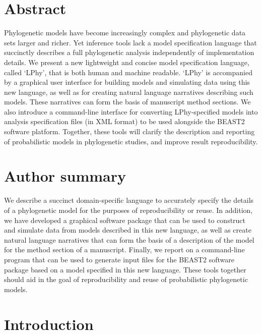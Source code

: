 \documentclass[10pt,letterpaper,table]{article}
\begin{document}
\section*{Abstract}
  Phylogenetic models have become increasingly complex and phylogenetic data sets larger and richer.
  Yet inference tools lack a model specification language that succinctly describes a full phylogenetic analysis independently of implementation details.
  We present a new lightweight and concise model specification language, called `LPhy', that is both human and machine readable.
  `LPhy' is accompanied by a graphical user interface for building models and simulating data using this new language, as well as for creating natural language narratives describing such models.
  These narratives can form the basis of manuscript method sections.
  We also introduce a command-line interface for converting LPhy-specified models into analysis specification files (in XML format) to be used alongside the BEAST2 software platform.
  Together, these tools will clarify the description and reporting of probabilistic models in phylogenetic studies, and improve result reproducibility.


\section*{Author summary}
  We describe a succinct domain-specific language to accurately specify the details of a phylogenetic model for the purposes of reproducibility or reuse.
  In addition, we have developed a graphical software package that can be used to construct and simulate data from models described in this new language, as well as create natural language narratives that can form the basis of a description of the model for the method section of a manuscript.
  Finally, we report on a command-line program that can be used to generate input files for the BEAST2 software package based on a model specified in this new language.
  These tools together should aid in the goal of reproducibility and reuse of probabilistic phylogenetic models. 


\linenumbers

\section{Introduction}
\end{document}

